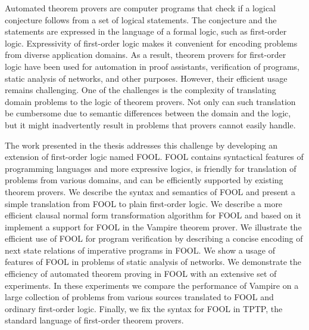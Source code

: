 Automated theorem provers are computer programs that check if a logical conjecture follows from a set of logical statements. The conjecture and the statements are expressed in the language of a formal logic, such as first-order logic. Expressivity of first-order logic makes it convenient for encoding problems from diverse application domains. As a result, theorem provers for first-order logic have been used for automation in proof assistants, verification of programs, static analysis of networks, and other purposes. However, their efficient usage remains challenging. One of the challenges is the complexity of translating domain problems to the logic of theorem provers. Not only can such translation be cumbersome due to semantic differences between the domain and the logic, but it might inadvertently result in problems that provers cannot easily handle.

The work presented in the thesis addresses this challenge by developing an extension of first-order logic named FOOL. FOOL contains syntactical features of programming languages and more expressive logics, is friendly for translation of problems from various domains, and can be efficiently supported by existing theorem provers. We describe the syntax and semantics of FOOL and present a simple translation from FOOL to plain first-order logic. We describe a more efficient clausal normal form transformation algorithm for FOOL and based on it implement a support for FOOL in the Vampire theorem prover. We illustrate the efficient use of FOOL for program verification by describing a concise encoding of next state relations of imperative programs in FOOL. We show a usage of features of FOOL in problems of static analysis of networks. We demonstrate the efficiency of automated theorem proving in FOOL with an extensive set of experiments. In these experiments we compare the performance of Vampire on a large collection of problems from various sources translated to FOOL and ordinary first-order logic. Finally, we fix the syntax for FOOL in TPTP, the standard language of first-order theorem provers.